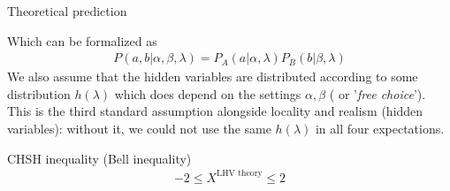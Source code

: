 \begin{parag}{Theoretical prediction}
\begin{center}
	\end{center}
	Which can be formalized as 
	\begin{align*} 
		P\left(a, b| \alpha, \beta, \lambda\right) = P_A\left(a| \alpha, \lambda\right)P_B\left(b|\beta, \lambda\right) 
	\end{align*}
	We also assume that the hidden variables are distributed according to some distribution $h\left(\lambda\right)$ which does  depend on the settings $\alpha, \beta$ ( or '\textit{free choice}'). This is the third standard assumption alongside locality and realism (hidden variables): without it, we could not use the same $h\left(\lambda\right)$ in all four expectations.
\end{parag}

\begin{theoreme}{CHSH inequality (Bell inequality)}
	\begin{align*} 
		-2 \leq X^{\text{LHV theory}}  \leq 2
	\end{align*}
\end{theoreme}
